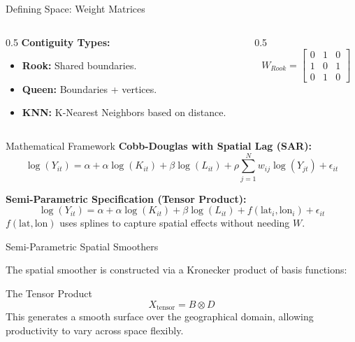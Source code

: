 \documentclass[12pt]{beamer}
\begin{document}
\begin{frame}{Defining Space: Weight Matrices}

	\begin{columns}
		\begin{column}{0.5\textwidth}
			\textbf{Contiguity Types:}
			\begin{itemize}
				\item \textbf{Rook:} Shared boundaries.
				\item \textbf{Queen:} Boundaries + vertices.
				\item \textbf{KNN:} K-Nearest Neighbors based on distance.
			\end{itemize}
		\end{column}
		\begin{column}{0.5\textwidth}
			\footnotesize
			\[ W_{Rook} = \begin{bmatrix} 0 & 1 & 0 \\ 1 & 0 & 1 \\ 0 & 1 & 0 \end{bmatrix} \]
		\end{column}
	\end{columns}
\end{frame}

\begin{frame}{Mathematical Framework}
	\textbf{Cobb-Douglas with Spatial Lag (SAR):}
	\begin{equation}
		\log(Y_{it}) = \alpha + \alpha \log(K_{it}) + \beta \log(L_{it}) + \rho \sum_{j=1}^N w_{ij} \log(Y_{jt}) + \epsilon_{it}
	\end{equation}

	\vfill
	\textbf{Semi-Parametric Specification (Tensor Product):}
	\begin{equation}
		\log(Y_{it}) = \alpha + \alpha \log(K_{it}) + \beta \log(L_{it}) + f(\text{lat}_i, \text{lon}_i) + \epsilon_{it}
	\end{equation}
	$f(\text{lat}, \text{lon})$ uses splines to capture spatial effects without needing $W$.
\end{frame}

\begin{frame}{Semi-Parametric Spatial Smoothers}

	The spatial smoother is constructed via a Kronecker product of basis functions:
	\begin{block}{The Tensor Product}
		\[ X_{\text{tensor}} = B \otimes D \]
		This generates a smooth surface over the geographical domain, allowing productivity to vary across space flexibly.
	\end{block}
\end{frame}
\end{document}
